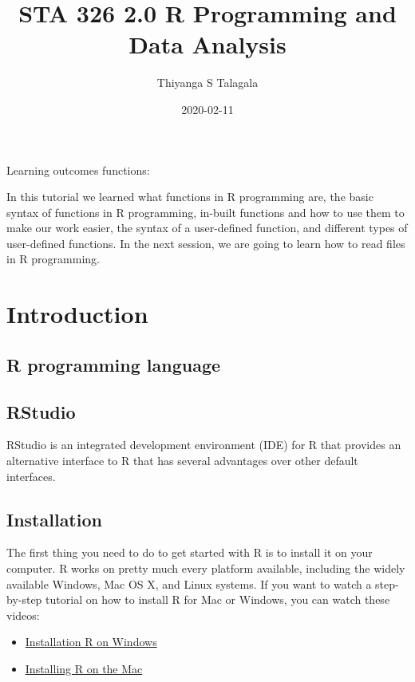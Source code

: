 \documentclass[]{book}
\title{STA 326 2.0 R Programming and Data Analysis}
\author{Thiyanga S Talagala}
\date{2020-02-11}
\begin{document}
\maketitle

{
\setcounter{tocdepth}{1}
\tableofcontents
}
Learning outcomes functions:

In this tutorial we learned what functions in R programming are, the basic syntax of functions in R programming, in-built functions and how to use them to make our work easier, the syntax of a user-defined function, and different types of user-defined functions. In the next session, we are going to learn how to read files in R programming.

\hypertarget{elements}{%
\chapter{Introduction}\label{elements}}

\hypertarget{r-programming-language}{%
\section{R programming language}\label{r-programming-language}}

\hypertarget{rstudio}{%
\section{RStudio}\label{rstudio}}

RStudio is an integrated development environment (IDE) for R that provides an alternative interface to R that has several advantages over other default interfaces.

\hypertarget{installation}{%
\section{Installation}\label{installation}}

The first thing you need to do to get started with R is to install it on your computer. R works on pretty much every platform available, including the widely available Windows, Mac OS X, and Linux systems. If you want to watch a step-by-step tutorial on how to install R for Mac or Windows, you can watch these videos:

\begin{itemize}
\item
  \href{https://www.youtube.com/watch?v=Ohnk9hcxf9M\&feature=youtu.be}{Installation R on Windows}
\item
  \href{https://www.youtube.com/watch?v=uxuuWXU-7UQ\&feature=youtu.be}{Installing R on the Mac}
\end{itemize}
\end{document}
